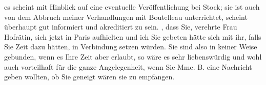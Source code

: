                es scheint mit Hinblick auf eine eventuelle Veröffentlichung bei Stock; sie ist auch von dem Abbruch meiner Verhandlungen mit
                  Boutelleau unterrichtet, scheint überhaupt
               gut informiert und akreditiert zu sein. \label{K_L03954-3v}\label{K_L03954-3}, dass Sie, verehrte Frau Hofrätin, sich jetzt in
                  Paris aufhielten und ich Sie gebeten hätte
               sich mit ihr, falls Sie Zeit dazu hätten, in Verbindung setzen würden. Sie sind also
               in keiner Weise gebunden, wenn es Ihre Zeit aber erlaubt, so wäre es sehr
               liebenswürdig und wohl auch vorteilhaft für die ganze Angelegenheit, wenn Sie Mme.
                  B. eine Nachricht geben wollten, ob Sie
               geneigt wären sie zu empfangen.\pend
           
